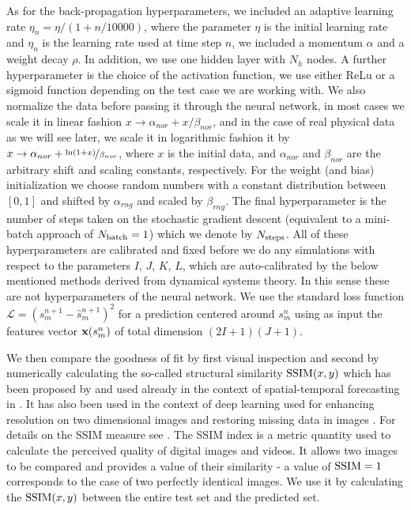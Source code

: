 \documentclass[journal]{IEEEtran}
\begin{document}
As for the back-propagation hyperparameters, we included an adaptive learning rate $\eta_n=\eta/(1+n/10000)$, where the parameter $\eta$ is the initial learning rate and $\eta_n$ is the learning rate used at time step
$n$, we included a momentum $\alpha$ and a weight decay $\rho$.
In addition, we use one hidden layer with $N_h$ nodes. A further hyperparameter is the choice of the activation function, we use either ReLu or a sigmoid function depending on the
 test case we are working with.
We also normalize the data before passing it through the neural network, in most cases we scale it in linear fashion
$x \to \alpha_{nor} + x/\beta_{nor}$, and in the case of real physical data as we will see later, 
we scale it in logarithmic fashion it by $x \to \alpha_{nor}+\nicefrac{\ln(1+x)}{\beta_{nor}}$, where $x$ is the initial data,
and $\alpha_{nor}$ and $\beta_{nor}$ are the arbitrary shift and scaling constants, respectively. For the weight (and bias)
initialization we choose random numbers with a constant distribution between $[0,1]$ and shifted by $\alpha_{rng}$ and scaled
by $\beta_{rng}$. The final hyperparameter is the number of steps taken on the stochastic gradient descent (equivalent to a mini-batch approach of $N_{\textnormal{batch}}=1$) which we denote by $N_{\textnormal{steps}}$.  All of these hyperparameters are calibrated and fixed
before we do any simulations with respect to the parameters $I$, $J$, $K$, $L$, which are auto-calibrated by the below mentioned
methods derived from dynamical systems theory. In this sense these are not hyperparameters of the neural network. We use the standard
loss function $\mathcal{L}=\left( s^{n+1}_{m} - \hat{s}^{n+1}_{m}\right)^2$ for a prediction centered around $s^{n}_{m}$ using as input
the features vector ${\bf x}(s^n_m)$ of total dimension  $(2 I+1)(J+1)$.


We then compare the goodness of fit by first visual inspection and second by numerically calculating the so-called
structural similarity $\textnormal{SSIM}(x,y)$ which has been proposed by \cite{Wang04imagequality} and used already in the context of spatial-temporal forecasting in \cite{covas2016, covaspeixinhojoao}. It has also been used in the context of deep learning used for enhancing
resolution on two dimensional images \cite{2015arXiv150100092D} and restoring missing data in images \cite{2018arXiv180208369Z}. For details on the SSIM measure see \cite{Wang04imagequality,2009ISPM...26...98W, 2012ITIP...21.1488B}.
The SSIM index is a metric quantity used to calculate the perceived quality of digital images and videos.  It
allows two images to be compared and provides a value of their similarity - a value of $\textnormal{SSIM}=1$ corresponds to the case of two
perfectly identical images. We use it by calculating the $\textnormal{SSIM}(x,y)$ between the entire test set and the predicted set.
\end{document}
